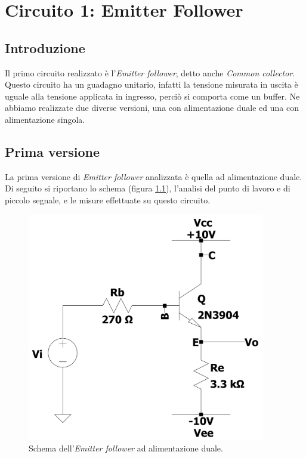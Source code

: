 \documentclass{report}
\begin{document}
\chapter{Circuito 1: Emitter Follower}
\section{Introduzione} \label{introEFv1}
Il primo circuito realizzato è l'\textit{Emitter follower}, detto anche \textit{Common collector}. Questo circuito ha un guadagno unitario, infatti la tensione misurata in uscita è uguale alla tensione applicata in ingresso, perciò si comporta come un buffer. Ne abbiamo realizzate due diverse versioni, una con alimentazione duale ed una con alimentazione singola. 
\section{Prima versione} %
La prima versione di \textit{Emitter follower} analizzata è quella ad alimentazione duale. Di seguito si riportano lo schema (figura \ref{figura:EFv1}), l'analisi del punto di lavoro e di piccolo segnale, e le misure effettuate su questo circuito. 
\begin{figure}[h]
\centering
\includegraphics[height=10cm]{immagini/EFv1}
\caption{Schema dell'\textit{Emitter follower} ad alimentazione duale.}
\label{figura:EFv1}
\end{figure}
\end{document}
